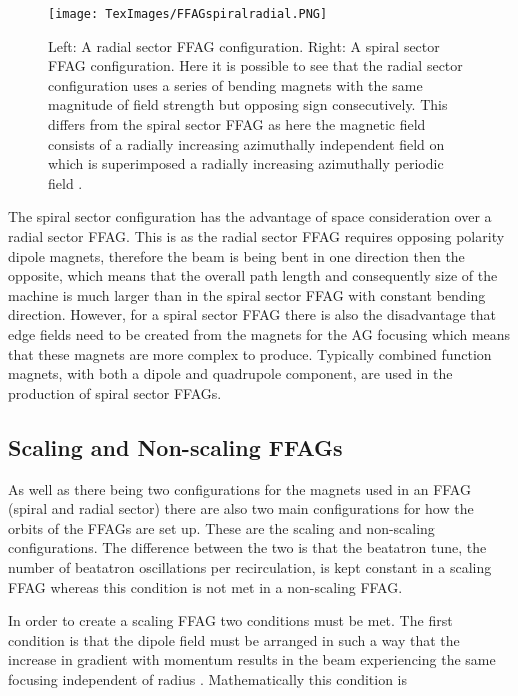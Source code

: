 \documentclass[11pt]{article}
\begin{document}
\begin{figure}[H]
\centering
\texttt{[image: TexImages/FFAGspiralradial.PNG]}
\caption{\label{fig:radspirFFAG} Left: A radial sector FFAG configuration. Right: A spiral sector FFAG configuration. \cite{spiralvradial} Here it is possible to see that the radial sector configuration uses a series of bending magnets with the same magnitude of field strength but opposing sign consecutively. This differs from the spiral sector FFAG as here the magnetic field consists of a radially increasing azimuthally independent field on which is superimposed a radially increasing azimuthally periodic field \cite{spiralvradial}.}
\end{figure}

The spiral sector configuration has the advantage of space consideration over a radial sector FFAG. This is as the radial sector FFAG requires opposing polarity dipole magnets, therefore the beam is being bent in one direction then the opposite, which means that the overall path length and consequently size of the machine is much larger than in the spiral sector FFAG with constant bending direction. However, for a spiral sector FFAG there is also the disadvantage that edge fields need to be created from the magnets for the AG focusing which means that these magnets are more complex to produce. Typically combined function magnets, with both a dipole and quadrupole component, are used in the production of spiral sector FFAGs. 


\subsection{Scaling and Non-scaling FFAGs}

As well as there being two configurations for the magnets used in an FFAG (spiral and radial sector) there are also two main configurations for how the orbits of the FFAGs are set up. These are the scaling and non-scaling configurations. The difference between the two is that the beatatron tune, the number of beatatron oscillations per recirculation, is kept constant in a scaling FFAG whereas this condition is not met in a non-scaling FFAG.

In order to create a scaling FFAG two conditions must be met. The first condition is that the dipole field must be arranged in such a way that the increase in gradient with momentum results in the beam experiencing the same focusing independent of radius \cite{sheehyFFAG}. Mathematically this condition is 
\end{document}
